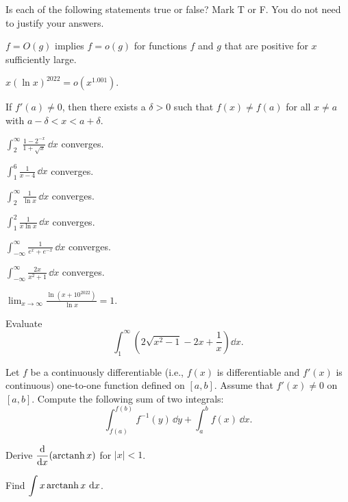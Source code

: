 \begin{problem}
Is each of the following statements true or false? Mark T or F. You do not need to justify your answers.
\begin{problemchoices}
\item $f=O(g)$ implies $f=o(g)$ for functions $f$ and $g$ that are positive for $x$ sufficiently large.
\item $x(\ln x)^{2022}=o(x^{1.001})$.
\item If $f'(a)\ne0$, then there exists a $\delta>0$ such that $f(x)\ne f(a)$ for all $x\ne a$ with $a-\delta<x<a+\delta$.
\item $\displaystyle\int_2^\infty\frac{1-2^{-x}}{1+\sqrt x}\,\dd x$ converges.
\item $\displaystyle\int_1^6\frac{1}{x-4}\,\dd x$ converges.
\item $\displaystyle\int_2^\infty\frac{1}{\ln x}\,\dd x$ converges.
\item $\displaystyle\int_1^2\frac{1}{x\ln x}\,\dd x$ converges.
\item $\displaystyle\int_{-\infty}^{\infty}\frac{1}{e^x+e^{-x}}\,\dd x$ converges.
\item $\displaystyle\int_{-\infty}^{\infty}\frac{2x}{x^2+1}\,\dd x$ converges.
\item $\displaystyle\lim_{x\to\infty}\frac{\ln(x+10^{2022})}{\ln x}=1$.
\end{problemchoices}
\end{problem}

\begin{problem}
Evaluate
\[
\int_1^\infty\left(2\sqrt{x^2-1}-2x+\frac1x\right)\dd x.
\]
\end{problem}

\begin{problem}
Let $f$ be a continuously differentiable (i.e., $f(x)$ is differentiable and $f'(x)$ is continuous) one-to-one function defined on $[a,b]$. Assume that $f'(x)\ne0$ on $[a,b]$. Compute the following sum of two integrals:
\[
\int_{f(a)}^{f(b)}f^{-1}(y)\,\dd y+\int_a^b f(x)\,\dd x.
\]
\end{problem}

\begin{problem}
\begin{problemsubparts}
\item Derive $\displaystyle\frac{\mathop{}\!\mathrm{d}}{\mathop{}\!\mathrm{d} x}(\operatorname{arctanh} x)$ for $|x|<1$.
\item Find $\displaystyle\int x\operatorname{arctanh} x\,\mathop{}\!\mathrm{d} x$.
\end{problemsubparts}
\end{problem}

